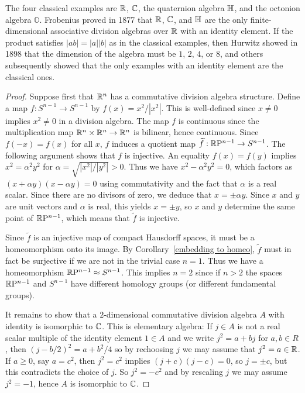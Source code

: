 The four classical examples are $\mathbb{R}$, $\mathbb{C}$, the quaternion algebra $\mathbb{H}$, and the octonion algebra $\mathbb{O}$. Frobenius proved in 1877 that $\mathbb{R}$, $\mathbb{C}$, and $\mathbb{H}$ are the only finite-dimensional associative division algebras over $\mathbb{R}$ with an identity element. If the product satisfies $|ab|=|a||b|$ as in the classical examples, then Hurwitz showed in 1898 that the dimension of the algebra must be $1$, $2$, $4$, or $8$, and others subsequently showed that the only examples with an identity element are the classical ones. 
\begin{proof}
Suppose first that $\mathbb{R}^n$ has a commutative division algebra structure. Define
a map $f:S^{n-1}\to S^{n-1}$ by $f(x)=x^2/|x^2|$. This is well-defined since $x\neq0$ implies $x^2\neq0$ in a division algebra. The map $f$ is continuous since the multiplication map $\mathbb{R}^n\times\mathbb{R}^n\to\mathbb{R}^n$ is bilinear, hence continuous. Since $f(-x)=f(x)$ for all $x$, $f$ induces a quotient map $\widetilde{f}:\mathbb{R}\mathrm{P}^{n-1}\to S^{n-1}$. The following argument shows that $f$ is injective. An equality $f(x)=f(y)$ implies $x^2=\alpha^2y^2$ for $\alpha=\sqrt{|x^2|/|y^2|}>0$. Thus we have $x^2-\alpha^2y^2=0$, which factors as $(x+\alpha y)(x-\alpha y)=0$ using commutativity and the fact that $\alpha$ is a real scalar. Since there are no divisors of zero, we deduce that $x=\pm\alpha y$. Since $x$ and $y$ are unit vectors and $\alpha$ is real, this yields $x=\pm y$, so $x$ and $y$ determine the same point of $\mathbb{R}\mathrm{P}^{n-1}$, which means that $\widetilde{f}$ is injective.\par
Since $\widetilde{f}$ is an injective map of compact Hausdorff spaces, it must be a homeomorphism onto its image. By Corollary~\ref{embedding to homeo}, $\widetilde{f}$ must in fact be surjective if we are not in the trivial case $n=1$. Thus we have a homeomorphism $\mathbb{R}\mathrm{P}^{n-1}\approx S^{n-1}$. This implies $n=2$ since if $n>2$ the spaces $\mathbb{R}\mathrm{P}^{n-1}$ and $S^{n-1}$ have different homology groups (or different fundamental groups).\par
It remains to show that a $2$-dimensional commutative division algebra $A$ with
identity is isomorphic to $\mathbb{C}$. This is elementary algebra: If $j\in A$ is not a real scalar multiple of the identity element $1\in A$ and we write $j^2=a+bj$ for $a,b\in R$, then $(j-b/2)^2=a+b^2/4$ so by rechoosing $j$ we may assume that $j^2=a\in\mathbb{R}$. If $a\geq0$, say $a=c^2$, then $j^2=c^2$ implies $(j+c)(j-c)=0$, so $j=\pm c$, but this contradicts the choice of $j$. So $j^2=-c^2$ and by rescaling $j$ we may assume $j^2=-1$, hence $A$ is isomorphic to $\mathbb{C}$.
\end{proof}
